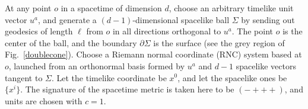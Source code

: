 \documentclass[aps,prd,twocolumn,showpacs,groupedaddress,nofootinbib,longbibliography]{revtex4-1}
\def\beq{\begin{equation}}
\def\eeq{\end{equation}}
\def\d{\delta}\def\D{\Delta}
\begin{document}
At any point $o$ in a spacetime of dimension $d$, choose an arbitrary timelike unit vector $u^a$, and generate a $(d-1)$-dimensional spacelike ball $\Sigma$ by sending out geodesics of length $\ell$ from $o$ in all directions orthogonal to $u^a$. 
The point $o$ is the center of the ball, and the boundary $\partial \Sigma$ is the surface (see the grey region of Fig.~\ref{doublecone}). 
Choose a Riemann normal coordinate (RNC) system based at $o$, launched from an orthonormal basis formed by 
$u^a$ and $d-1$ spacelike vectors tangent to $\Sigma$.  Let the timelike coordinate be $x^0$, and
let the spacelike ones be $\{x^i\}$. The signature of the spacetime metric is taken here to be $({-}{+}{+}{+})$, and units are chosen with $c=1$.
%
\end{document}
